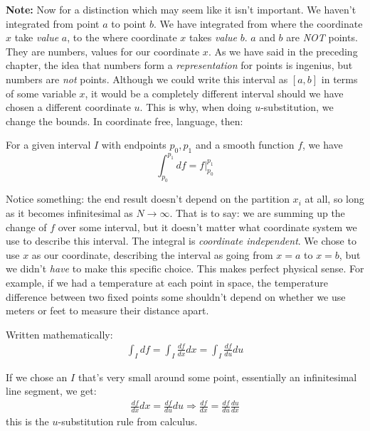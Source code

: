 \noindent \textbf{Note:}
	Now for a distinction which may seem like it isn't important. We haven't integrated from point $a$ to point $b$. We have integrated from where the coordinate $x$ take \emph{value} $a$, to the where coordinate $x$ takes \emph{value} $b$. $a$ and $b$ are \emph{NOT} points. They are numbers, values for our coordinate $x$. As we have said in the preceding chapter, the idea that numbers form a \emph{representation} for points is ingenius, but numbers are \emph{not} points. Although we could write this interval as $[a,b]$ in terms of some variable $x$, it would be a completely different interval should we have chosen a different coordinate $u$. This is why, when doing $u$-substitution, we change the bounds. In coordinate free, language, then:

	
	\begin{theorem}\label{thm:FTOC}
		For a given interval $I$ with endpoints $p_0, p_1$ and a smooth function $f$, we have
		\begin{equation}
			  \int_{p_0}^{p_1} df = f \Big\rvert_{p_0}^{p_1} 
		\end{equation}
	\end{theorem}
	Notice something: the end result doesn't depend on the partition $x_i$ at all, so long as it becomes infinitesimal as $N \rightarrow \infty$. That is to say: we are summing up the change of $f$ over some interval, but it doesn't matter what coordinate system we use to describe this interval. The integral is \emph{coordinate independent}. We chose to use $x$ as our coordinate, describing the interval as going from $x=a$ to $x=b$, but we didn't \emph{have} to make this specific choice. This makes perfect physical sense. For example, if we had a temperature at each point in space, the temperature difference between two fixed points some shouldn't depend on whether we use meters or feet to measure their distance apart.  
	
	Written mathematically: 
	\begin{align*}
		\int_I df = \int_I \frac{df}{dx} dx = \int_I \frac{df}{du} du 
	\end{align*}
	
	If we chose an $I$ that's very small around some point, essentially an infinitesimal line segment, we get:
	\begin{align*}
		\frac{df}{dx} dx =  \frac{df}{du} du \Rightarrow \frac{df}{dx} = \frac{df}{du} \frac{du}{dx}
	\end{align*}
	this is the $u$-substitution rule from calculus.
	\\

